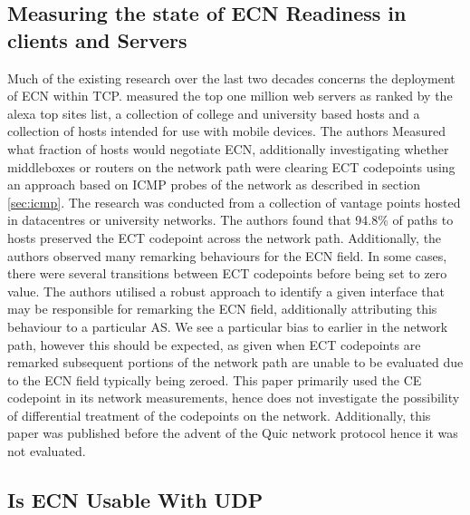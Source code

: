 \documentclass{l4proj}
\begin{document}
\subsection{Measuring the state of ECN Readiness in clients and Servers}


Much of the existing research over the last two decades concerns the deployment of ECN within TCP. \cite{bauer_measuring_2011} measured the top one million web servers as ranked by the alexa top sites list, a collection of college and university based hosts and a collection of hosts intended for use with mobile devices. The authors Measured what fraction of hosts would negotiate ECN, additionally investigating whether middleboxes or routers on the network path were clearing ECT codepoints using an approach based on ICMP probes of the network as described in section \ref{sec:icmp}. The research was conducted from a collection of vantage points hosted in datacentres or university networks. The authors found that 94.8\% of paths to hosts preserved the ECT codepoint across the network path. Additionally, the authors observed many remarking behaviours for the ECN field. In some cases, there were several transitions between ECT codepoints before being set to zero value. The authors utilised a robust approach to identify a given interface that may be responsible for remarking the ECN field, additionally attributing this behaviour to a particular AS. We see a particular bias to earlier in the network path, however this should be expected, as given when ECT codepoints are remarked subsequent portions of the network path are unable to be evaluated due to the ECN field typically being zeroed. This paper primarily used the CE codepoint in its network measurements, hence does not investigate the possibility of differential treatment of the codepoints on the network. Additionally, this paper was published before the advent of the Quic network protocol hence it was not evaluated.


\subsection{Is ECN Usable With UDP}
\end{document}
